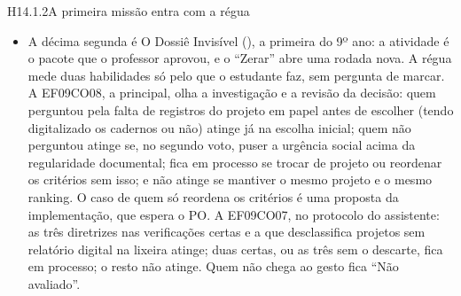 \begin{historia}{H14.1.2}{A primeira missão entra com a régua}{\pronto}
\begin{itemize}
    \enquote{Zerar} abre uma rodada nova. A régua mede seis habilidades só
    pelo que o estudante faz, e o que conta é o gráfico FINAL --- a errata,
    se houve; senão a primeira publicação. A EM13CO12, a principal: eixo em
    0\% com a fonte atinge; eixo em 0\% sem a fonte, ou em 80\% com ela, fica
    em processo; eixo em 80\% sem fonte não atinge. A EM13CO22, pelas
    informações ligadas: duas ou três atingem, uma fica em processo, nenhuma
    não atinge. A EM13CO21, pela explicação da escala: ligada já na primeira
    atinge; só na errata, ou desligada na errata, fica em processo. A
    EM13CO26, pela responsabilidade: a primeira já adequada (eixo em 0\% com
    a fonte), ou a errata que corrige o que faltava, atinge --- trocar o eixo
    de 80\% para 0\% conta mesmo tirando a fonte ---; a errata que não
    corrige nada fica em processo; seguir sem errata com a primeira
    inadequada, ou levar o eixo de 0\% para 80\%, não atinge. Essas quatro
    são medidas quando o estudante decide a errata. A EM13CO13, na primeira
    publicação: abrir a nota técnica antes do compositor e antes do lembrete
    do assistente atinge; depois do lembrete fica em processo; não abrir não
    atinge. E a EM13CO14, na perícia: sinalizar só o gráfico B, pela escala,
    atinge; outro motivo, ou o A também, fica em processo; não sinalizar o B,
    ou pular a perícia, não atinge. Quem não chega ao gesto fica
    \enquote{Não avaliado}.
  \item A décima segunda é O Dossiê Invisível (), a primeira do
    9º ano: a atividade é o pacote que o professor aprovou, e o
    \enquote{Zerar} abre uma rodada nova. A régua mede duas habilidades só
    pelo que o estudante faz, sem pergunta de marcar. A EF09CO08, a
    principal, olha a investigação e a revisão da decisão: quem perguntou
    pela falta de registros do projeto em papel antes de escolher (tendo
    digitalizado os cadernos ou não) atinge já na escolha inicial; quem não
    perguntou atinge se, no segundo voto, puser a urgência social acima da
    regularidade documental; fica em processo se trocar de projeto ou
    reordenar os critérios sem isso; e não atinge se mantiver o mesmo projeto
    e o mesmo ranking. O caso de quem só reordena os critérios é uma
    proposta da implementação, que espera o PO. A EF09CO07, no protocolo do
    assistente: as três diretrizes nas verificações certas e a que
    desclassifica projetos sem relatório digital na lixeira atinge; duas
    certas, ou as três sem o descarte, fica em processo; o resto não atinge.
    Quem não chega ao gesto fica \enquote{Não avaliado}.
\end{itemize}
\end{historia}

